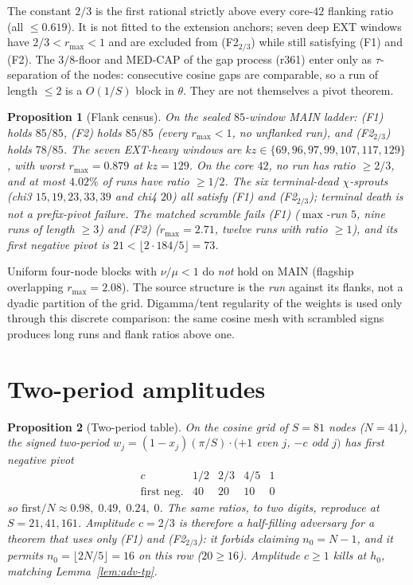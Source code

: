 \documentclass[11pt]{article}
\newtheorem{prop}{Proposition}
\theoremstyle{remark}
\begin{document}
The constant $2/3$ is the first rational strictly above every
core-$42$ flanking ratio (all $\le 0.619$).  It is not fitted to
the extension anchors; seven deep EXT windows have $2/3<r_{\max}<1$
and are excluded from (F2$_{2/3}$) while still satisfying (F1)
and (F2).  The $3/8$-floor and MED-CAP of the gap process
(r361) enter only as $\tau$-separation of the nodes: consecutive
cosine gaps are comparable, so a run of length $\le 2$ is a
$O(1/S)$ block in $\theta$.  They are not themselves a pivot
theorem.

\begin{prop}[Flank census]\label{prop:census}
On the sealed $85$-window MAIN ladder: (F1) holds $85/85$, (F2)
holds $85/85$ (every $r_{\max}<1$, no unflanked run), and
(F2$_{2/3}$) holds $78/85$.  The seven EXT-heavy windows are
$kz\in\{69,96,97,99,107,117,129\}$, with worst $r_{\max}=0.879$
at $kz=129$.  On the core $42$, no run has ratio $\ge 2/3$, and
at most $4.02\%$ of runs have ratio $\ge 1/2$.  The six
terminal-dead $\chi$-sprouts (chi3 $15,19,23,33,39$ and chi4
$20$) all satisfy (F1) and (F2$_{2/3}$); terminal death is not a
prefix-pivot failure.  The matched scramble fails (F1)
($\max$-run $5$, nine runs of length $\ge 3$) and (F2)
($r_{\max}=2.71$, twelve runs with ratio $\ge 1$), and its
first negative pivot is $21<\lfloor 2\cdot 184/5\rfloor=73$.
\end{prop}

Uniform four-node blocks with $\nu/\mu<1$ do \emph{not} hold on
MAIN (flagship overlapping $r_{\max}=2.08$).  The source
structure is the \emph{run} against its flanks, not a dyadic
partition of the grid.  Digamma/tent regularity of the weights
is used only through this discrete comparison: the same cosine
mesh with scrambled signs produces long runs and flank ratios
above one.

\section{Two-period amplitudes}\label{sec:tp}

\begin{prop}[Two-period table]\label{prop:twoperiod}
On the cosine grid of $S=81$ nodes ($N=41$), the signed two-period
$w_j=(1-x_j)(\pi/S)\cdot(+1$ even $j$, $-c$ odd $j)$ has first
negative pivot
\[
\begin{array}{c|cccc}
c & 1/2 & 2/3 & 4/5 & 1\\
\hline
\text{first neg.} & 40 & 20 & 10 & 0
\end{array}
\]
so $\mathrm{first}/N \approx 0.98,\;0.49,\;0.24,\;0$.  The same
ratios, to two digits, reproduce at $S=21,41,161$.  Amplitude
$c=2/3$ is therefore a half-filling adversary for a theorem that
uses only (F1) and (F2$_{2/3}$): it forbids claiming
$n_0=N-1$, and it permits $n_0=\lfloor 2N/5\rfloor=16$ on this
row ($20\ge 16$).  Amplitude $c\ge 1$ kills at $h_0$, matching
Lemma~\ref{lem:adv-tp}.
\end{prop}
\end{document}
